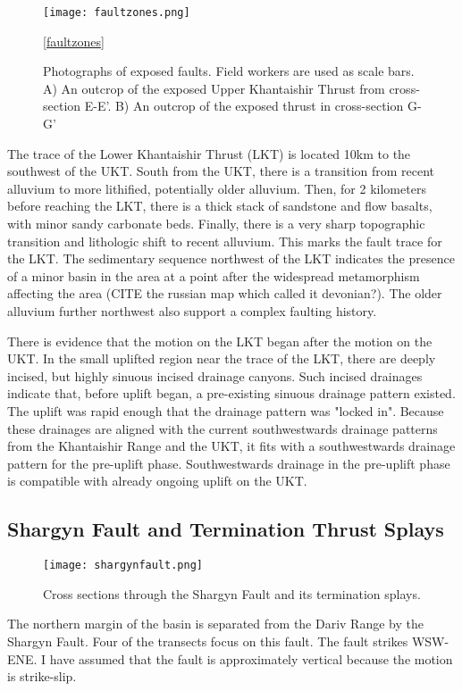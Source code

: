 \documentclass[10pt,a4paper]{article}
\begin{document}
\begin{figure}[h!]
  \centering
  \texttt{[image: faultzones.png]}
  \caption{Photographs of exposed faults. Field workers are used as scale bars. A) An outcrop of the exposed Upper Khantaishir Thrust from cross-section E-E'. B) An outcrop of the exposed thrust in cross-section G-G'}
  \ref{faultzones}
\end{figure}


The trace of the Lower Khantaishir Thrust (LKT) is located 10km to the southwest of the UKT. South from the UKT, there is a transition from recent alluvium to more lithified, potentially older alluvium. Then, for 2 kilometers before reaching the LKT, there is a thick stack of sandstone and flow basalts, with minor sandy carbonate beds. Finally, there is a very sharp topographic transition and lithologic shift to recent alluvium. This marks the fault trace for the LKT. The sedimentary sequence northwest of the LKT indicates the presence of a minor basin in the area at a point after the widespread metamorphism affecting the area (CITE the russian map which called it devonian?). The older alluvium further northwest also support a complex faulting history.

There is evidence that the motion on the LKT began after the motion on the UKT. In the small uplifted region near the trace of the LKT, there are deeply incised, but highly sinuous incised drainage canyons. Such incised drainages indicate that, before uplift began, a pre-existing sinuous drainage pattern existed. The uplift was rapid enough that the drainage pattern was "locked in". Because these drainages are aligned with the current southwestwards drainage patterns from the Khantaishir Range and the UKT, it fits with a southwestwards drainage pattern for the pre-uplift phase. Southwestwards drainage in the pre-uplift phase is compatible with already ongoing uplift on the UKT.

\subsection{Shargyn Fault and Termination Thrust Splays}
\begin{figure}[h!]
  \centering
  \texttt{[image: shargynfault.png]}
  \caption{Cross sections through the Shargyn Fault and its termination splays.}
  \label{shargynfaultxsecs}
\end{figure}
The northern margin of the basin is separated from the Dariv Range by the Shargyn Fault. Four of the transects focus on this fault. The fault strikes WSW-ENE. I have assumed that the fault is approximately vertical because the motion is strike-slip. 
\end{document}
